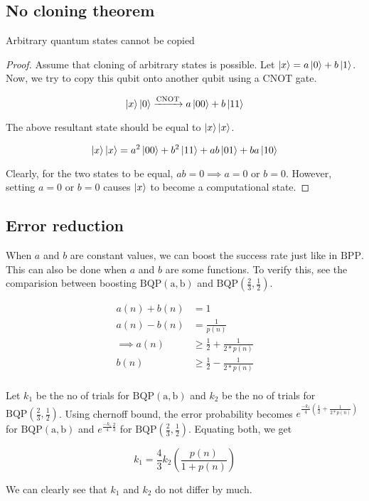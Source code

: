 \documentclass[../main.tex]{subfiles}
\begin{document}
\subsection{No cloning theorem}

\begin{claim}
Arbitrary quantum states cannot be copied
\end{claim}
\begin{proof}
Assume that cloning of arbitrary states is possible.
Let $\ket{x} = a\ket{0} + b\ket{1}$. Now, we try to copy this qubit onto another qubit using a $\mathrm{CNOT}$ gate.

\begin{equation*}
    \ket{x}\ket{0} \xrightarrow{\mathrm{CNOT}} a\ket{00} + b\ket{11}
\end{equation*}

\noindent The above resultant state should be equal to $\ket{x}\ket{x}$.

\begin{equation*}
    \ket{x}\ket{x} = a^2\ket{00} + b^2\ket{11} + ab\ket{01} + ba\ket{10}
\end{equation*}

\noindent Clearly, for the two states to be equal, $ab = 0 \implies a = 0 \text{ or } b = 0$. However, setting $a = 0 \text{ or } b = 0$ causes $\ket{x}$ to become a computational state.
\end{proof}

\subsection{Error reduction}
When $a$ and $b$ are constant values, we can boost the success rate just like in $\mathrm{BPP}$. This can also be done when $a$ and $b$ are some functions. To verify this, see the comparision between boosting $\mathrm{BQP(a,b)}$ and $\mathrm{BQP(\frac{2}{3},\frac{1}{2})}$.

\begin{align*}
    a(n) + b(n) & = 1\\
    a(n) - b(n) & = \frac{1}{p(n)}\\
    \implies a(n) & \ge \frac{1}{2} + \frac{1}{2*p(n)}\\
    b(n) & \ge \frac{1}{2} - \frac{1}{2*p(n)}\\
\end{align*}

Let $k_1$ be the no of trials for $\mathrm{BQP(a,b)}$ and $k_2$ be the no of trials for $\mathrm{BQP(\frac{2}{3},\frac{1}{2})}$. Using chernoff bound, the error probability becomes $e^{\frac{-k_1}{4}(\frac{1}{2}+\frac{1}{2*p(n)})}$ for $\mathrm{BQP(a,b)}$ and $e^{\frac{-k_1}{4}\frac{2}{3}}$ for $\mathrm{BQP(\frac{2}{3},\frac{1}{2})}$. Equating both, we get

\begin{equation*}
    k_1 = \frac{4}{3}k_2(\frac{p(n)}{1+p(n)})
\end{equation*}

\noindent We can clearly see that $k_1$ and $k_2$ do not differ by much.
\end{document}
